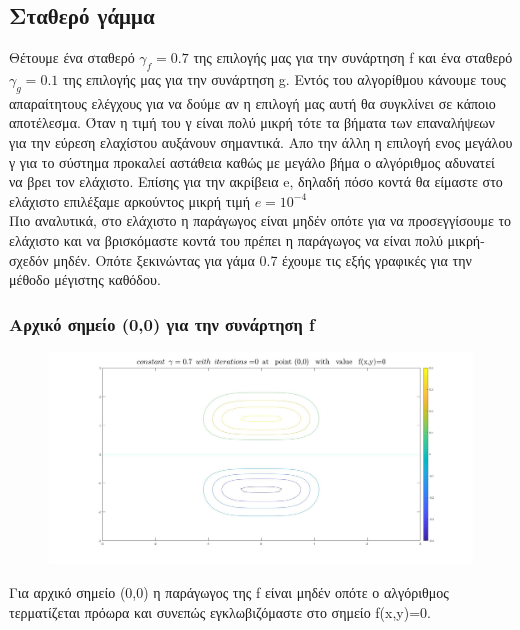 \documentclass{article}
\begin{document}
\subsection*{Σταθερό γάμμα}
Θέτουμε ένα σταθερό $\boxed{γ_f=0.7}$ της επιλογής μας για την συνάρτηση f και ένα σταθερό $\boxed{γ_g=0.1}$ της επιλογής μας για την συνάρτηση g. Εντός του αλγορίθμου κάνουμε τους απαραίτητους ελέγχους για να δούμε αν η επιλογή μας αυτή θα συγκλίνει σε κάποιο αποτέλεσμα. Όταν η τιμή του γ είναι πολύ μικρή τότε τα βήματα των επαναλήψεων για την εύρεση ελαχίστου αυξάνουν σημαντικά. Απο την άλλη η επιλογή ενος μεγάλου γ για το σύστημα προκαλεί αστάθεια καθώς με μεγάλο βήμα ο αλγόριθμος αδυνατεί να βρει τον ελάχιστο. Επίσης για την ακρίβεια e, δηλαδή πόσο κοντά θα είμαστε στο ελάχιστο επιλέξαμε αρκούντος μικρή τιμή $\boxed{e = 10^{-4}}$\\Πιο αναλυτικά, στο ελάχιστο η παράγωγος είναι μηδέν οπότε για να προσεγγίσουμε το ελάχιστο και να βρισκόμαστε κοντά του πρέπει η παράγωγος να είναι πολύ μικρή-σχεδόν μηδέν. 
Οπότε ξεκινώντας για γάμα 0.7 έχουμε τις εξής γραφικές για την μέθοδο μέγιστης καθόδου.
\clearpage
\subsubsection*{Αρχικό σημείο (0,0) για την συνάρτηση f}
\begin{figure}[h!]	
     \centering  
     \advance\leftskip-0.2cm  
  \includegraphics[width=140mm,scale=2]{t1a.jpg}
\end{figure} 
Για αρχικό σημείο (0,0) η παράγωγος της f είναι μηδέν οπότε ο αλγόριθμος τερματίζεται πρόωρα και συνεπώς εγκλωβιζόμαστε στο σημείο f(x,y)=0.
\end{document}
